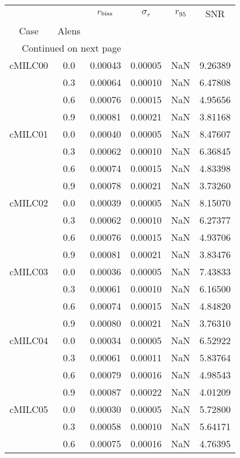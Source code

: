 \begin{longtable}{cccccc}
\toprule
        &     &  $r_{\rm bias}$  &  $\sigma_r$ &  $r_{95}$ &     SNR \\
Case & Alens &                  &             &           &         \\
\midrule
\endhead
\midrule
\multicolumn{3}{r}{{Continued on next page}} \\
\midrule
\endfoot

\bottomrule
\endlastfoot
cMILC00 & 0.0 & 0.00043 & 0.00005 & NaN & 9.26389 \\
        & 0.3 & 0.00064 & 0.00010 & NaN & 6.47808 \\
        & 0.6 & 0.00076 & 0.00015 & NaN & 4.95656 \\
        & 0.9 & 0.00081 & 0.00021 & NaN & 3.81168 \\
cMILC01 & 0.0 & 0.00040 & 0.00005 & NaN & 8.47607 \\
        & 0.3 & 0.00062 & 0.00010 & NaN & 6.36845 \\
        & 0.6 & 0.00074 & 0.00015 & NaN & 4.83398 \\
        & 0.9 & 0.00078 & 0.00021 & NaN & 3.73260 \\
cMILC02 & 0.0 & 0.00039 & 0.00005 & NaN & 8.15070 \\
        & 0.3 & 0.00062 & 0.00010 & NaN & 6.27377 \\
        & 0.6 & 0.00076 & 0.00015 & NaN & 4.93706 \\
        & 0.9 & 0.00081 & 0.00021 & NaN & 3.83476 \\
cMILC03 & 0.0 & 0.00036 & 0.00005 & NaN & 7.43833 \\
        & 0.3 & 0.00061 & 0.00010 & NaN & 6.16500 \\
        & 0.6 & 0.00074 & 0.00015 & NaN & 4.84820 \\
        & 0.9 & 0.00080 & 0.00021 & NaN & 3.76310 \\
cMILC04 & 0.0 & 0.00034 & 0.00005 & NaN & 6.52922 \\
        & 0.3 & 0.00061 & 0.00011 & NaN & 5.83764 \\
        & 0.6 & 0.00079 & 0.00016 & NaN & 4.98543 \\
        & 0.9 & 0.00087 & 0.00022 & NaN & 4.01209 \\
cMILC05 & 0.0 & 0.00030 & 0.00005 & NaN & 5.72800 \\
        & 0.3 & 0.00058 & 0.00010 & NaN & 5.64171 \\
        & 0.6 & 0.00075 & 0.00016 & NaN & 4.76395 \\

\end{longtable}
